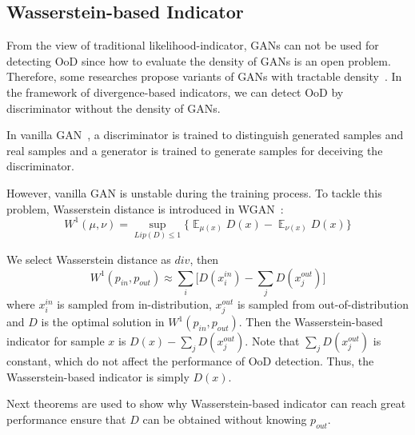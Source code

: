 \documentclass[letterpaper]{article} %
\newcommand{\E}{\operatorname{\mathbb{E}}}
\newcommand{\pin}{p_{in}}
\newcommand{\pout}{p_{out}}
\begin{document}
\subsection{Wasserstein-based Indicator}
From the view of traditional likelihood-indicator, GANs can not be used for detecting OoD since  how to evaluate the density of GANs is an open problem\cite{nalisnick2019do}. Therefore, some researches propose variants of GANs with tractable density~\cite{kumar2019maximum}. In the framework of divergence-based indicators, we can detect OoD by discriminator without the density of GANs.                                                                                                                                                                                                                                                                                                                                                                                                      

In vanilla GAN~\cite{goodfellow2014generative}, a discriminator is trained to distinguish generated samples and real samples and a generator is trained to generate samples for deceiving the discriminator.

However, vanilla GAN is unstable during the training process. To tackle this problem, Wasserstein distance is introduced in WGAN~\cite{arjovsky2017wasserstein}:
\begin{equation}
	W^1(\mu, \nu) = \sup_{Lip(D) \leq 1} \{\E_{\mu(x)} D(x)  - \E_{\nu(x)} D(x)\}
\end{equation}

We select Wasserstein distance as $div$, then
\begin{equation}
	W^1(\pin, \pout) \approx \sum_i \Big[D(x_i^{in}) - \sum_j D(x_j^{out})\Big]
\end{equation} 
where $x_i^{in}$ is sampled from in-distribution, $x_j^{out}$ is sampled from out-of-distribution and $D$ is the optimal solution in $W^1(\pin, \pout)$. Then the Wasserstein-based indicator for sample $x$ is $D(x) - \sum_{j} D(x_j^{out})$. Note that $\sum_{j} D(x_j^{out})$ is constant, which do not affect the performance of OoD detection. Thus, the Wasserstein-based indicator is simply $D(x)$. 

Next theorems are used to show why Wasserstein-based indicator can reach great performance ensure that $D$ can be obtained without knowing $\pout$. 
\end{document}
